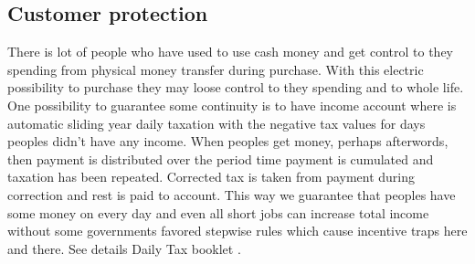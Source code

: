 \subsection{Customer protection}
\label{customer_protection}
There is lot of people who have used to use cash money and get control to they
spending from physical money transfer during purchase. With this electric
possibility to purchase they may loose control to they spending and to whole
life. One possibility to guarantee some continuity is to have income account
where is automatic sliding year daily taxation with the negative tax values
for days peoples didn't have any income. When peoples get money, perhaps
afterwords, then payment is distributed over the period time payment is
cumulated and taxation has been repeated. Corrected tax is taken from payment
during correction and rest is paid to account. This way we guarantee that
peoples have some money on every day and even all short jobs can increase
total income without some governments favored stepwise rules which cause
incentive traps here and there. See details Daily Tax booklet\allowbreak\cite{
DayTax}%
.

